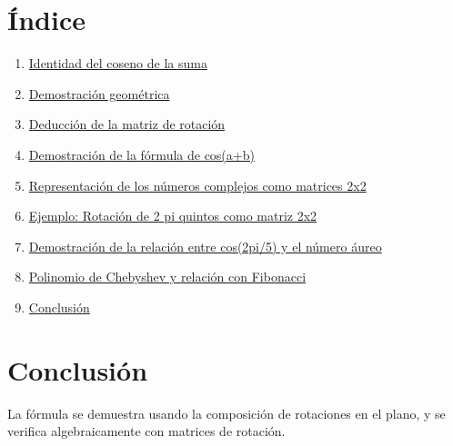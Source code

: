 \documentclass{article}
\begin{document}
\section*{Índice}
\begin{enumerate}
  \item \hyperref[sec:identidad]{Identidad del coseno de la suma}
  \item \hyperref[sec:geom]{Demostración geométrica}
  \item \hyperref[sec:rotacion]{Deducción de la matriz de rotación}
  \item \hyperref[sec:demcos]{Demostración de la fórmula de cos(a+b)}
  \item \hyperref[sec:complejos]{Representación de los números complejos como matrices 2x2}
  \item \hyperref[sec:ejemplo]{Ejemplo: Rotación de 2 pi quintos como matriz 2x2}
  \item \hyperref[sec:cosenoaureo]{Demostración de la relación entre cos(2pi/5) y el número áureo}
  \item \hyperref[sec:chebfib]{Polinomio de Chebyshev y relación con Fibonacci}
  \item \hyperref[sec:conclusion]{Conclusión}
\end{enumerate}










\section{Conclusión}\label{sec:conclusion}
La fórmula se demuestra usando la composición de rotaciones en el plano, y se verifica algebraicamente con matrices de rotación.
\end{document}
